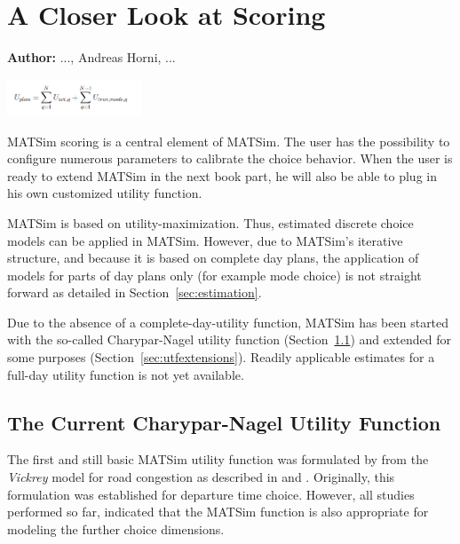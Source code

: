 \chapter{A Closer Look at Scoring}
\label{ch:scoring}

\hfill \textbf{Author:} ..., Andreas Horni, ...

\begin{center} \includegraphics[width=0.3\textwidth, angle=0]{using/figures/utf.png} \end{center}

MATSim scoring is a central element of MATSim. The user has the possibility to configure numerous parameters to calibrate the choice behavior.  When the user is ready to extend MATSim in the next book part, he will also be able to plug in his own customized utility function.

MATSim is based on utility-maximization. Thus, estimated discrete choice models can be applied in MATSim. However, due to MATSim's iterative structure, and because it is based on complete day plans, the application of models for parts of day plans only (for example mode choice) is not straight forward as detailed in Section~\ref{sec:estimation}.

Due to the absence of a complete-day-utility function, MATSim has been started with the so-called Charypar-Nagel utility function (Section~\ref{sec:charyparnagel}) and extended for some purposes (Section~\ref{sec:utfextensions}). Readily applicable estimates for a full-day utility function is not yet available. 

\section{The Current Charypar-Nagel Utility Function}
\label{sec:charyparnagel}
The first and still basic MATSim utility function was formulated by \citet[][]{CharyparNagel_Transportation_2005} from the \emph{Vickrey} model for road congestion as described in \citet[][]{Vickrey_TAER_1969} and \citet[][]{ArnottEtAl_TAER_1993}. Originally, this formulation was established for departure time choice. However, all studies performed so far, indicated that the MATSim function is also appropriate for modeling the further choice dimensions.

